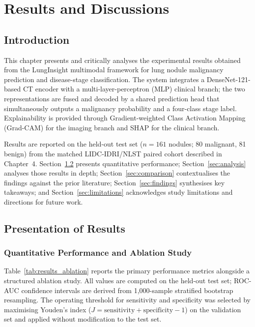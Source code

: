 \chapter{Results and Discussions}\thispagestyle{empty}
\graphicspath{{Chapter5/}}
{

\section{Introduction}

This chapter presents and critically analyses the experimental results obtained from the
LungInsight multimodal framework for lung nodule malignancy prediction and disease-stage
classification. The system integrates a DenseNet-121-based CT encoder with a
multi-layer-perceptron (MLP) clinical branch; the two representations are fused and decoded
by a shared prediction head that simultaneously outputs a malignancy probability and a
four-class stage label. Explainability is provided through Gradient-weighted Class Activation
Mapping (Grad-CAM) for the imaging branch and SHAP for the clinical branch.

Results are reported on the held-out test set ($n = 161$ nodules; 80 malignant, 81 benign)
from the matched LIDC-IDRI/NLST paired cohort described in Chapter~4. Section~\ref{sec:results}
presents quantitative performance; Section~\ref{sec:analysis} analyses those results in depth;
Section~\ref{sec:comparison} contextualises the findings against the prior literature;
Section~\ref{sec:findings} synthesises key takeaways; and Section~\ref{sec:limitations}
acknowledges study limitations and directions for future work.


\section{Presentation of Results}
\label{sec:results}

\subsection{Quantitative Performance and Ablation Study}

Table~\ref{tab:results_ablation} reports the primary performance metrics alongside a
structured ablation study. All values are computed on the held-out test set; ROC-AUC
confidence intervals are derived from 1{,}000-sample stratified bootstrap resampling.
The operating threshold for sensitivity and specificity was selected by maximising
Youden's index ($J = \text{sensitivity} + \text{specificity} - 1$) on the validation set
and applied without modification to the test set.

}
